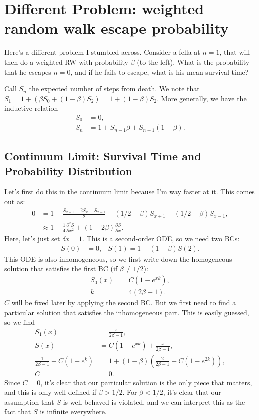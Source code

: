 \documentclass[12pt]{report}
\newcommand*{\pd}[2]{\frac{\partial#1}{\partial#2}}
\newcommand*{\ptd}[2]{\frac{\partial^2 #1}{\partial#2^2}}
\newcommand*{\p}[1]{\left(#1\right)}
\begin{document}
\section{Different Problem: weighted random walk escape probability}

Here's a different problem I stumbled across. Consider a fella at $n = 1$, that
will then do a weighted RW with probability $\beta$ (to the left). What is the
probability that he escapes $n = 0$, and if he fails to escape, what is his mean
survival time?

Call $S_n$ the expected number of steps from death. We note that $S_1 = 1 +
(\beta S_0 + (1 - \beta)S_2) = 1 + (1 - \beta) S_2$. More generally, we have the
inductive relation
\begin{align}
    S_0 &= 0,\\
    S_n &= 1 + S_{n - 1}\beta + S_{n + 1}(1 - \beta).
\end{align}

\subsection{Continuum Limit: Survival Time and Probability Distribution}

Let's first do this in the continuum limit because I'm way faster at it. This
comes out as:
\begin{align}
    0 &= 1 + \frac{S_{x + 1} - 2S_x + S_{x - 1}}{2}
            + \p{1/2 - \beta}S_{x + 1} - \p{1/2 - \beta}S_{x - 1},\\
        &\approx 1 + \frac{1}{4}\ptd{S}{x} + \p{1 - 2\beta}\pd{S}{x}.
\end{align}
Here, let's just set $\delta x = 1$. This is a second-order ODE, so we need two
BCs:
\begin{align}
    S(0) &= 0, & S(1) = 1 + \p{1 - \beta}S(2).
\end{align}
This ODE is also inhomogeneous, so we first write down the homogeneous solution
that satisfies the first BC (if $\beta \neq 1/2$):
\begin{align}
    S_0(x) &= C\p{1 - e^{xk}},\\
    k &= 4\p{2\beta - 1}.
\end{align}
$C$ will be fixed later by applying the second BC\@. But we first need to find a
particular solution that satisfies the inhomogeneous part. This is easily
guessed, so we find
\begin{align}
    S_1(x) &= \frac{x}{2\beta - 1},\\
    S(x) &= C\p{1 - e^{xk}} + \frac{x}{2\beta - 1},\\
    \frac{1}{2\beta - 1} + C\p{1 - e^k}
        &= 1 + \p{1 - \beta}\p{
            \frac{2}{2\beta - 1} + C\p{1 - e^{2k}}},\\
    C &= 0.
\end{align}
Since $C = 0$, it's clear that our particular solution is the only piece that
matters, and this is only well-defined if $\beta > 1/2$. For $\beta < 1/2$, it's
clear that our assumption that $S$ is well-behaved is violated, and we can
interpret this as the fact that $S$ is infinite everywhere.
\end{document}
